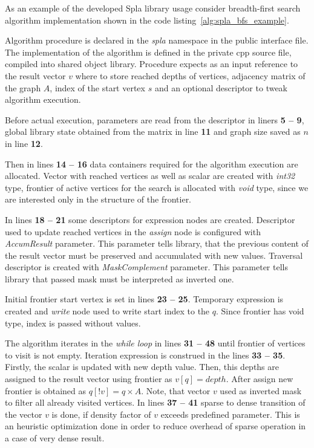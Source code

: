 As an example of the developed Spla library usage consider breadth-first search algorithm implementation shown in the code listing~\ref{alg:spla_bfs_example}. 

Algorithm procedure is declared in the \textit{spla} namespace in the public interface file. The implementation of the algorithm is defined in the private cpp source file, compiled into shared object library. Procedure expects as an input reference to the result vector $v$ where to store reached depths of vertices, adjacency matrix of the graph $A$, index of the start vertex $s$ and an optional descriptor to tweak algorithm execution.

Before actual execution, parameters are read from the descriptor in liners \textbf{5 -- 9}, global library state obtained from the matrix in line \textbf{11} and graph size saved as $n$ in line \textbf{12}.

Then in lines \textbf{14 -- 16} data containers required for the algorithm execution are allocated. Vector with reached vertices as well as scalar are created with \textit{int32} type, frontier of active vertices for the search is allocated with \textit{void} type, since we are interested only in the structure of the frontier.

In lines \textbf{18 -- 21} some descriptors for expression nodes are created. Descriptor used to update reached vertices in the \textit{assign} node is configured with \textit{AccumResult} parameter. This parameter tells library, that the previous content of the result vector must be preserved and accumulated with new values. Traversal descriptor is created with \textit{MaskComplement} parameter. This parameter tells library that passed mask must be interpreted as inverted one.

Initial frontier start vertex is set in lines \textbf{23 -- 25}. Temporary expression is created and \textit{write} node used to write start index to the $q$. Since frontier has void type, index is passed without values.

The algorithm iterates in the \textit{while loop} in lines \textbf{31 -- 48} until frontier of vertices to visit is not empty. Iteration expression is construed in the lines \textbf{33 -- 35}. Firstly, the scalar is updated with new depth value. Then, this depths are assigned to the result vector using frontier as $v[q] = depth$. After assign new frontier is obtained as $q[!v] = q \times A$. Note, that vector $v$ used as inverted mask to filter all already visited vertices. In lines \textbf{37 -- 41} sparse to dense transition of the vector $v$ is done, if density factor of $v$ exceeds predefined parameter. This is an heuristic optimization done in order to reduce overhead of sparse operation in a case of very dense result.

